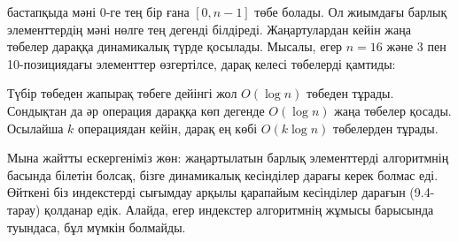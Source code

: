  бастапқыда 
мәні 0-ге тең бір ғана $[0,n-1]$ төбе болады. 
Ол жиымдағы барлық элементтердің мәні нөлге тең дегенді білдіреді.
Жаңартулардан кейін жаңа төбелер дараққа динамикалық түрде
қосылады. 
Мысалы, егер $n=16$ және 3 пен 10-позициядағы элементтер
өзгертілсе, дарақ келесі төбелерді қамтиды:

\begin{center}
\end{center}

Түбір төбеден жапырақ төбеге дейінгі жол 
$O(\log n)$ төбеден тұрады. Сондықтан да әр операция
дараққа көп дегенде $O(\log n)$ жаңа төбелер қосады.
Осылайша $k$ операциядан кейін, дарақ ең көбі 
$O(k \log n)$ төбелерден тұрады.


Мына жайтты ескергеніміз жөн: жаңартылатын барлық
элементтерді алгоритмнің басында  білетін болсақ, бізге динамикалық кесінділер дарағы
керек болмас еді. Өйткені біз индекстерді сығымдау арқылы
қарапайым кесінділер дарағын (9.4-тарау)
қолданар едік. Алайда, егер индекстер алгоритмнің жұмысы барысында туындаса, бұл мүмкін болмайды. 

